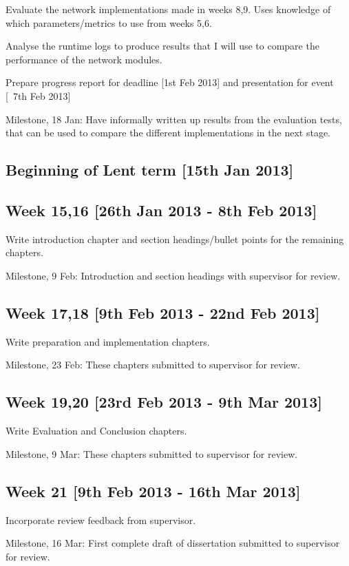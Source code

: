 \documentclass[12pt,twoside,notitlepage]{report}
\begin{document}
Evaluate the network implementations made in weeks 8,9.  Uses knowledge of which parameters/metrics to use from weeks 5,6.

Analyse the runtime logs to produce results that I will use to compare the performance of the network modules.

Prepare progress report for deadline [1st Feb 2013] and presentation for event [~7th Feb 2013]

Milestone, 18 Jan: Have informally written up results from the evaluation tests, that can be used to compare the different implementations in the next stage.

\subsection*{Beginning of Lent term [15th Jan 2013]}

\subsection*{Week 15,16 [26th Jan 2013 - 8th Feb 2013]}
Write introduction chapter and section headings/bullet points for the remaining chapters.

Milestone, 9 Feb: Introduction and section headings with supervisor for review.

\subsection*{Week 17,18 [9th Feb 2013 - 22nd Feb 2013]}
Write preparation and implementation chapters.

Milestone, 23 Feb: These chapters submitted to supervisor for review.

\subsection*{Week 19,20 [23rd Feb 2013 - 9th Mar 2013]}
Write Evaluation and Conclusion chapters.

Milestone, 9 Mar: These chapters submitted to supervisor for review.

\subsection*{Week 21 [9th Feb 2013 - 16th Mar 2013]}
Incorporate review feedback from supervisor.

Milestone, 16 Mar: First complete draft of dissertation submitted to supervisor for review.
\end{document}
